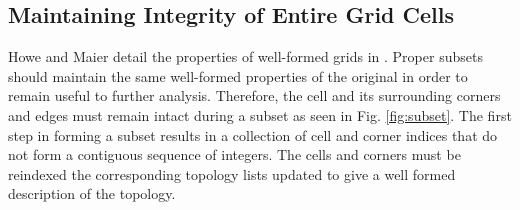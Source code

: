 \subsection{Maintaining Integrity of Entire Grid Cells}

Howe and Maier detail the properties of well-formed grids in \cite{UGRID}.
Proper subsets should maintain the same well-formed properties of the original
in order to remain useful to further analysis.  Therefore, the cell and its
surrounding corners and edges must remain intact during a subset as seen in
Fig. \ref{fig:subset}. The first step in forming a subset results in a
collection of cell and corner indices that do not form a contiguous sequence
of integers. The cells and corners must be reindexed the corresponding
topology lists updated to give a well formed description of the topology.

